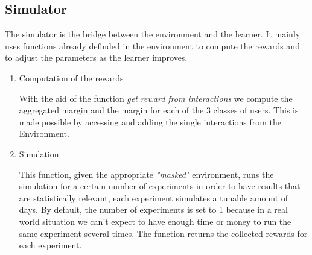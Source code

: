     \subsection{Simulator}
    The simulator is the bridge between the environment and the learner. It mainly uses functions already definded in the environment to compute the rewards and to adjust the parameters as the learner improves.

        \begin{enumerate}
            \item Computation of the rewards

                With the aid of the function \textit{get reward from interactions} we compute the aggregated margin and the margin for each of the 3 classes of users. This is made possible by accessing and adding the single interactions from the Environment.

            \item Simulation

                This function, given the appropriate \textit{"masked"} environment, runs the simulation for a certain number of experiments in order to have results that are statistically relevant, each experiment simulates a tunable amount of days. By default, the number of experiments is set to 1 because in a real world situation we can't expect to have enough time or money to run the same experiment several times. The function returns the collected rewards for each experiment.
        \end{enumerate}
